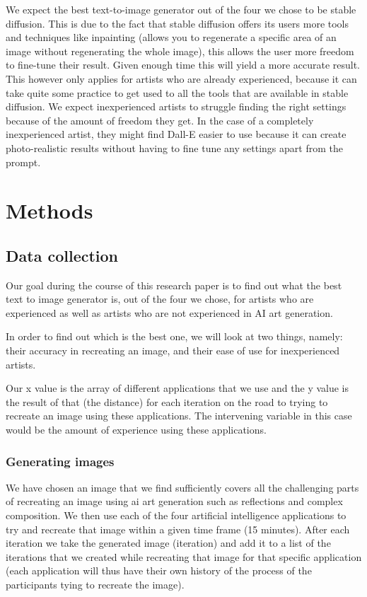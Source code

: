 \documentclass[]{report}
\begin{document}
We expect the best text-to-image generator out of the four we chose to be stable diffusion. This is due to the fact that stable diffusion offers its users more tools and techniques like inpainting (allows you to regenerate a specific area of an image without regenerating the whole image), this allows the user more freedom to fine-tune their result. Given enough time this will yield a more accurate result. This however only applies for artists who are already experienced, because it can take quite some practice to get used to all the tools that are available in stable diffusion. We expect inexperienced artists to struggle finding the right settings because of the amount of freedom they get. In the case of a completely inexperienced artist, they might find Dall-E easier to use because it can create photo-realistic results without having to fine tune any settings apart from the prompt.
	
\pagebreak
	
	\section{Methods}
	
	\subsection{Data collection}
	Our goal during the course of this research paper is to find out what the best text to image generator is, out of the four we chose, for artists who are experienced as well as artists who are not experienced in AI art generation.
	
	In order to find out which is the best one, we will look at two things, namely: their accuracy in recreating an image, and their ease of use for inexperienced artists.
	
	Our x value is the array of different applications that we use and the y value is the result of that (the distance) for each iteration on the road to trying to recreate an image using these applications. The intervening variable in this case would be the amount of experience using these applications.
	
	\subsubsection{Generating images}
	We have chosen an image that we find sufficiently covers all the challenging parts of recreating an image using ai art generation such as reflections and complex composition. We then use each of the four artificial intelligence applications to try and recreate that image within a given time frame (15 minutes). After each iteration we take the generated image (iteration) and add it to a list of the iterations that we created while recreating that image for that specific application (each application will thus have their own history of the process of the participants tying to recreate the image). 
	
\end{document}
